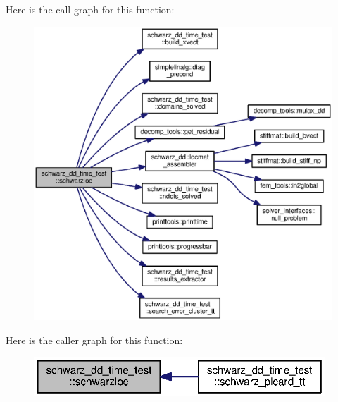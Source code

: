 Here is the call graph for this function\+:\nopagebreak
\begin{figure}[H]
\begin{center}
\leavevmode
\includegraphics[width=350pt]{namespaceschwarz__dd__time__test_ac055f89162bd3f14323b125cdd0253a6_cgraph}
\end{center}
\end{figure}




Here is the caller graph for this function\+:\nopagebreak
\begin{figure}[H]
\begin{center}
\leavevmode
\includegraphics[width=310pt]{namespaceschwarz__dd__time__test_ac055f89162bd3f14323b125cdd0253a6_icgraph}
\end{center}
\end{figure}


